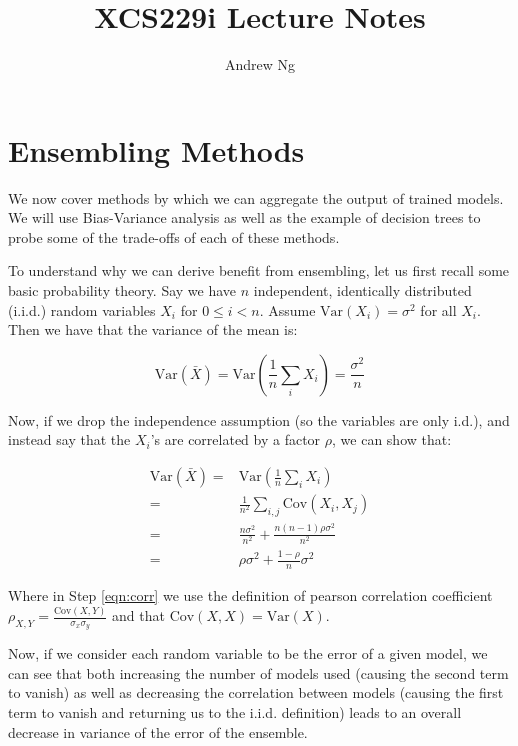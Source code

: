 \documentclass{article}
\begin{document}
\title{XCS229i Lecture Notes}
\author{Andrew Ng}
\date{}
\maketitle


\part*{Ensembling Methods}

We now cover methods by which we can aggregate the output of trained models.  We will use Bias-Variance analysis as well as the example of decision trees to probe some of the trade-offs of each of these methods.

To understand why we can derive benefit from ensembling, let us first recall some basic probability theory.  Say we have $n$ independent, identically distributed (i.i.d.) random variables $X_i$ for $0 \leq i < n$.  Assume $\mathrm{Var}(X_i) = \sigma^2$ for all $X_i$.  Then we have that the variance of the mean is:

$$\mathrm{Var}(\bar{X}) = \mathrm{Var}(\frac{1}{n}\sum_i X_i) = \frac{\sigma^2}{n}$$

Now, if we drop the independence assumption (so the variables are only i.d.), and instead say that the $X_i$'s are correlated by a factor $\rho$, we can show that:

\begin{align}
\mathrm{Var}(\bar{X}) =&  \mathrm{Var}(\frac{1}{n}\sum_i X_i) \\ 
=&\frac{1}{n^2} \sum_{i, j} \mathrm{Cov}(X_i, X_j) \\
=&\frac{n \sigma^2}{n^2} + \frac{n (n - 1) \rho \sigma^2}{n^2} \label{eqn:corr}\\
=&\rho \sigma^2 + \frac{1 - \rho}{n} \sigma^2 \label{eqn:final}
\end{align}

Where in Step \ref{eqn:corr} we use the definition of pearson correlation coefficient $\rho_{X, Y} = \frac{\mathrm{Cov}(X, Y)}{\sigma_x \sigma_y}$ and that $\mathrm{Cov}(X, X) = \mathrm{Var}(X)$.  


Now, if we consider each random variable to be the error of a given model, we can see that both increasing the number of models used (causing the second term to vanish) as well as decreasing the correlation between models (causing the first term to vanish and returning us to the i.i.d. definition) leads to an overall decrease in variance of the error of the ensemble.  
\end{document}

